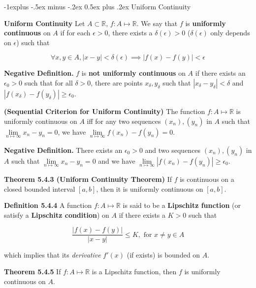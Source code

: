 \documentclass[10pt,landscape]{article}
\makeatletter
\renewcommand{\subsection}{\@startsection{subsection}{2}{0mm}%
                                {-1explus -.5ex minus -.2ex}%
                                {0.5ex plus .2ex}%
                                {\normalfont\normalsize\bfseries}}
\makeatother
\begin{document}
\begin{multicols}{4}
\subsection{Uniform Continuity}

\textbf{Uniform Continuity} Let $A \subset \mathbb{R}$, $f: A \mapsto \mathbb{R}$. We say that $f$ is \textbf{uniformly continuous} on $A$ if for each $\epsilon > 0$, there exists a $\delta(\epsilon) > 0$ ($\delta (\epsilon)$ only depends on $\epsilon$) such that 

$$
\forall x, y \in A, |x - y| < \delta(\epsilon) \implies |f(x) - f(y)| < \epsilon
$$

\textbf{Negative Definition.} $f$ is \textbf{not uniformly continuous} on $A$ if there exists an $\epsilon_0 > 0$ such that for all $\delta > 0$, there are points $x_{\delta}, y_{\delta}$ such that $|x_{\delta} - y_{\delta}| < \delta$ and $|f(x_{\delta}) - f(y_{\delta})| \geq \epsilon_0$.

\textbf{(Sequential Criterion for Uniform Continuity)} The function $f: A \mapsto \mathbb{R}$ is uniformly continuous on $A$ iff for any two sequences $(x_n), (y_n)$ in $A$ such that $\underset{n \mapsto \infty}{\lim} x_n - y_n = 0$, we have $\underset{n \mapsto \infty}{\lim} f(x_n) - f(y_n) = 0$.

\textbf{Negative Definition.} There exists an $\epsilon_0 > 0$ and two sequences $(x_n), (y_n)$ in $A$ such that $\underset{n \mapsto \infty}{\lim} x_n - y_n = 0$ and we have $\underset{n \mapsto \infty}{\lim} |f(x_n) - f(y_n)| \geq \epsilon_0$.

\textbf{Theorem 5.4.3 (Uniform Continuity Theorem)} If $f$ is continuous on a closed bounded interval $[a, b]$, then it is uniformly continuous on $[a, b]$.

\textbf{Definition 5.4.4} A function $f: A \mapsto \mathbb{R}$ is said to be a \textbf{Lipschitz function} (or satisfy a \textbf{Lipschitz condition}) on $A$ if there exists a $K > 0$ such that 



$$
\frac{|f(x) - f(y)|}{|x - y|} \leq K, \text{ for } x \neq y \in A
$$

which implies that its \textit{derivative} $f'(x)$ (if exists) is bounded on $A$.

\textbf{Theorem 5.4.5} If $f: A \mapsto \mathbb{R}$ is a Lipschitz function, then $f$ is uniformly continuous on $A$.


\end{multicols}
\end{document}
